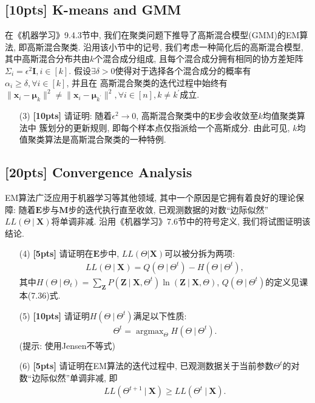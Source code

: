 \documentclass[a4paper,UTF8]{article}
\numberwithin{equation}{section}
\theoremstyle{definition}
\newcommand{\bds}{\boldsymbol}
\def \X {\boldsymbol{X}}
\def \x {\boldsymbol{x}}
\newcommand\given[1][]{\:#1\vert\:}
\begin{document}
\subsection{[10pts] K-means and GMM}
在《机器学习》9.4.3节中, 我们在聚类问题下推导了高斯混合模型(GMM)的EM算法, 即高斯混合聚类. 沿用该小节中的记号, 我们考虑一种简化后的高斯混合模型, 
其中高斯混合分布共由$k$个混合成分组成, 且每个混合成分拥有相同的协方差矩阵$\Sigma_i = \epsilon^2 \mathbf{I}, i \in [k]$.
假设$\exists \delta > 0$使得对于选择各个混合成分的概率有$\alpha_i \geq \delta, \forall i \in [k]$, 并且在
高斯混合聚类的迭代过程中始终有
$\|\x_i - \bds{\mu}_k\|^2 \neq \|\x_i - \bds{\mu}_{k^\prime}\|^2, \forall i \in [n], k \neq k^\prime$成立.

\begin{itemize}
    \item[(3)] \textbf{[10pts]} 请证明: 随着$\epsilon^2 \to 0$, 高斯混合聚类中的$\mathbf{E}$步会收敛至$k$均值聚类算法中
    簇划分的更新规则, 即每个样本点仅指派给一个高斯成分. 由此可见, $k$均值聚类算法是高斯混合聚类的一种特例.
\end{itemize}

\subsection{[20pts] Convergence Analysis}
EM算法广泛应用于机器学习等其他领域, 其中一个原因是它拥有着良好的理论保障: 
随着$\mathbf{E}$步与$\mathbf{M}$步的迭代执行直至收敛, 已观测数据的对数“边际似然”$LL(\Theta \given \X)$将单调非减. 
沿用《机器学习》7.6节中的符号定义, 我们将试图证明该结论.

\begin{itemize}
    \item[(4)] \textbf{[5pts]} 请证明在$\mathbf{E}$步中, $LL(\Theta|\X)$可以被分拆为两项:
    \begin{align*}
        LL(\Theta \given \X) = Q(\Theta \given \Theta^t) - H(\Theta \given \Theta^t),
    \end{align*}
    其中$H(\Theta \given \Theta_t) = \sum_{\bds{Z}} P(\bds{Z} \given \X, \Theta^t) \ln(\bds{Z} \given \X, \Theta)$, 
    $Q(\Theta \given \Theta^t)$的定义见课本(7.36)式.

    \item[(5)] \textbf{[10pts]} 请证明$H(\Theta \given \Theta^t)$满足以下性质:
    \begin{align*}
        \Theta^t = \operatorname{\arg \max}_{\Theta} H(\Theta \given \Theta^t).
    \end{align*}
    (提示: 使用Jensen不等式)

    \item[(6)] \textbf{[5pts]} 请证明在EM算法的迭代过程中, 已观测数据关于当前参数$\Theta^t$的对数“边际似然”单调非减, 即
    \begin{align*}
        LL(\Theta^{t+1} \given \X) \geq LL(\Theta^t \given \X).
    \end{align*}
   
\end{itemize}
\end{document}
